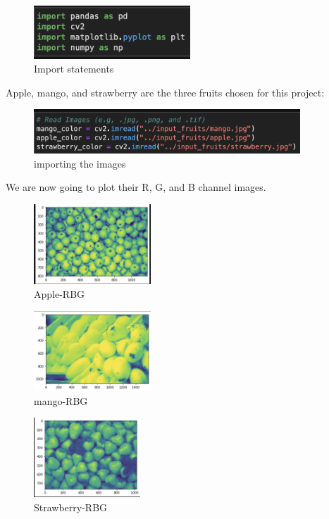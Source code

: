 \documentclass[conference]{IEEEtran}
\begin{document}
\begin{figure}[!htbp]
    \centering
    \includegraphics[height=2cm]{import.png}
      \caption{Import statements}
  \label{fig:Apple-RBG }
  \end{figure}
  
Apple, mango, and strawberry are the three fruits chosen for this project:\\
\begin{figure}[!htbp]
    \centering
    \includegraphics[width=10cm]{image upload.png}
     \caption{importing the images}
  \label{fig:Strawberry-RBG }
    
\end{figure}
We are now going to plot their R, G, and B channel images.
\begin{figure}[!htbp]
    \centering
    \includegraphics[height=3cm]{apple_rgb.png}
      \caption{Apple-RBG}
  \label{fig:Apple-RBG }
   
\end{figure}

\begin{figure}[!htbp]
    \centering
    \includegraphics[height=3cm]{mango_rgb.png}
      \caption{mango-RBG}
  \label{fig:mango-RBG }
    
\end{figure}


\begin{figure}[!htbp]
    \centering
    \includegraphics[height=3cm]{strawberry_rgb.png}
     \caption{Strawberry-RBG}
  \label{fig:Strawberry-RBG }
    
\end{figure}
\end{document}
